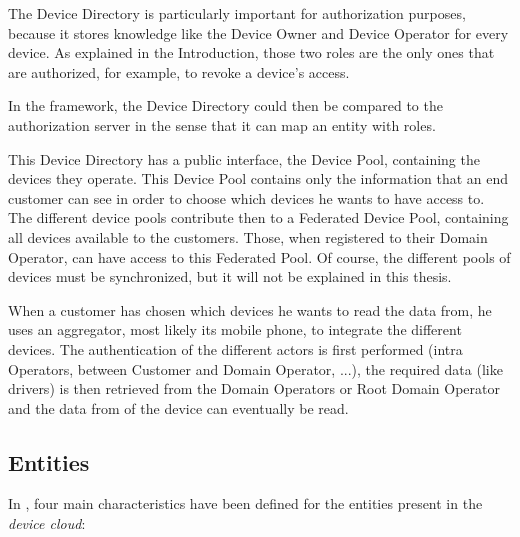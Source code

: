 The Device Directory is particularly important for authorization purposes, because it stores knowledge like the Device Owner and Device Operator for every device. As explained in the Introduction, those two roles are the only ones that are authorized, for example, to revoke a device's access. 

In the framework, the Device Directory could then be compared to the authorization server in the sense that it can map an entity with roles.

This Device Directory has a public interface, the Device Pool, containing the devices they operate. This Device Pool contains only the information that an end customer can see in order to choose which devices he wants to have access to. The different device pools contribute then to a Federated Device Pool, containing all devices available to the customers. Those, when registered to their Domain Operator, can have access to this Federated Pool. Of course, the different pools of devices must be synchronized, but it will not be explained in this thesis.

When a customer has chosen which devices he wants to read the data from, he uses an aggregator, most likely its mobile phone, to integrate the different devices. The authentication of the different actors is first performed (intra Operators, between Customer and Domain Operator, ...), the required data (like drivers) is then retrieved from the Domain Operators or Root Domain Operator and the data from of the device can eventually be read.

 \subsection{Entities}
 In , four main characteristics have been defined for the entities present in the \emph{device cloud}:
 
